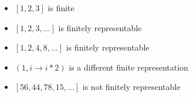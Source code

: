 \begin{itemize}[<+->]
\item $[1,2,3]$ is finite
\item $[1,2,3,...]$ is finitely representable
\item $[1,2,4,8,...]$ is finitely representable
\item $(1, i \to i * 2)$ is a different finite representation
\item $[56,44,78,15,...]$ is not finitely representable
\end{itemize}

